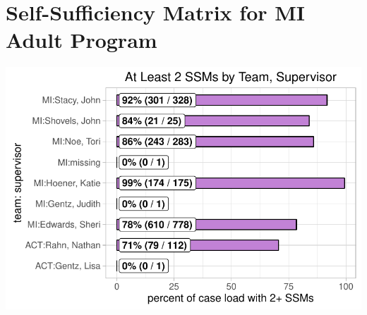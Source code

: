 \documentclass{article}\usepackage[]{graphicx}\usepackage[]{color}
\makeatletter
\def\maxwidth{ %
  \ifdim\Gin@nat@width>\linewidth
    \linewidth
  \else
    \Gin@nat@width
  \fi
}
\newenvironment{knitrout}{}{} %
\makeatother
\begin{document}
{}

\pagebreak
\section{Self-Sufficiency Matrix for MI Adult Program}
\begin{knitrout}
\color{fgcolor}
\includegraphics[width=\maxwidth]{figure/ssm_ts-1} 

\end{knitrout}

\end{document}
